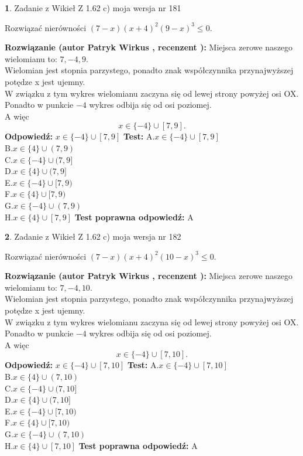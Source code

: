 \documentclass[12pt, a4paper]{article}
\theoremstyle{definition} %
\newtheorem{zad}{}
\newcommand{\zadStart}[1]{\begin{zad}#1\newline}
\newcommand{\zadStop}{\end{zad}}
\newcommand{\rozwStart}[2]{\noindent \textbf{Rozwiązanie (autor #1 , recenzent #2): }\newline}
\newcommand{\rozwStop}{\newline}
\newcommand{\odpStart}{\noindent \textbf{Odpowiedź:}\newline}
\newcommand{\odpStop}{\newline}
\newcommand{\testStart}{\noindent \textbf{Test:}\newline}
\newcommand{\testStop}{\newline}
\newcommand{\kluczStart}{\noindent \textbf{Test poprawna odpowiedź:}\newline}
\newcommand{\kluczStop}{\newline}
\begin{document}
\zadStart{Zadanie z Wikieł Z 1.62 c) moja wersja nr 181}

Rozwiązać nierówności $(7-x)(x+4)^{2}(9-x)^{3}\le0$.
\zadStop
\rozwStart{Patryk Wirkus}{}
Miejsca zerowe naszego wielomianu to: $7, -4, 9$.\\
Wielomian jest stopnia parzystego, ponadto znak współczynnika przy\linebreak najwyższej potędze x jest ujemny.\\ W związku z tym wykres wielomianu zaczyna się od lewej strony powyżej osi OX.\\
Ponadto w punkcie $-4$ wykres odbija się od osi poziomej.\\
A więc $$x \in \{-4\} \cup [7,9].$$
\rozwStop
\odpStart
$x \in \{-4\} \cup [7,9]$
\odpStop
\testStart
A.$x \in \{-4\} \cup [7,9]$\\
B.$x \in \{4\} \cup (7,9)$\\
C.$x \in \{-4\} \cup (7,9]$\\
D.$x \in \{4\} \cup (7,9]$\\
E.$x \in \{-4\} \cup [7,9)$\\
F.$x \in \{4\} \cup [7,9)$\\
G.$x \in \{-4\} \cup (7,9)$\\
H.$x \in \{4\} \cup [7,9]$
\testStop
\kluczStart
A
\kluczStop



\zadStart{Zadanie z Wikieł Z 1.62 c) moja wersja nr 182}

Rozwiązać nierówności $(7-x)(x+4)^{2}(10-x)^{3}\le0$.
\zadStop
\rozwStart{Patryk Wirkus}{}
Miejsca zerowe naszego wielomianu to: $7, -4, 10$.\\
Wielomian jest stopnia parzystego, ponadto znak współczynnika przy\linebreak najwyższej potędze x jest ujemny.\\ W związku z tym wykres wielomianu zaczyna się od lewej strony powyżej osi OX.\\
Ponadto w punkcie $-4$ wykres odbija się od osi poziomej.\\
A więc $$x \in \{-4\} \cup [7,10].$$
\rozwStop
\odpStart
$x \in \{-4\} \cup [7,10]$
\odpStop
\testStart
A.$x \in \{-4\} \cup [7,10]$\\
B.$x \in \{4\} \cup (7,10)$\\
C.$x \in \{-4\} \cup (7,10]$\\
D.$x \in \{4\} \cup (7,10]$\\
E.$x \in \{-4\} \cup [7,10)$\\
F.$x \in \{4\} \cup [7,10)$\\
G.$x \in \{-4\} \cup (7,10)$\\
H.$x \in \{4\} \cup [7,10]$
\testStop
\kluczStart
A
\kluczStop
\end{document}
